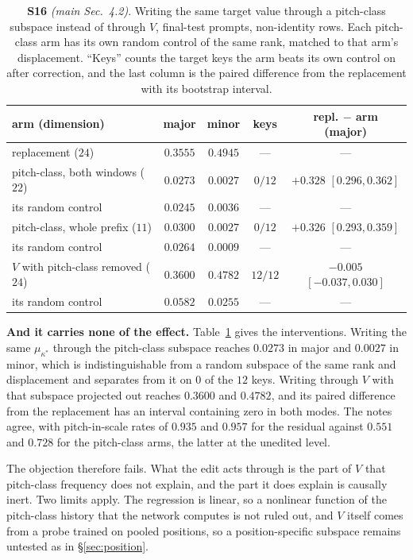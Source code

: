 \documentclass{article}
\begin{document}
\begin{table}[!t]
\centering
\caption{\textbf{S16} \textit{(main Sec.~4.2)}. Writing the same target value through a
pitch-class subspace instead of through $V$, final-test prompts, non-identity rows.
Each pitch-class arm has its own random control of the same rank, matched to that arm's
displacement. ``Keys'' counts the target keys the arm beats its own control on after
correction, and the last column is the paired difference from the replacement with its
bootstrap interval.}
\label{tab:supp-pitchclass}
\footnotesize
\setlength{\tabcolsep}{3pt}
\begin{tabular}{@{}lcccc@{}}
\toprule
arm (dimension) & major & minor & keys & repl. $-$ arm (major)\\
\midrule
replacement ($24$)         & $0.3555$ & $0.4945$ & --- & ---\\
pitch-class, both windows ($22$) & $0.0273$ & $0.0027$ & $0/12$ & $+0.328$ $[0.296,0.362]$\\
\quad its random control    & $0.0245$ & $0.0036$ & --- & ---\\
pitch-class, whole prefix ($11$) & $0.0300$ & $0.0027$ & $0/12$ & $+0.326$ $[0.293,0.359]$\\
\quad its random control    & $0.0264$ & $0.0009$ & --- & ---\\
$V$ with pitch-class removed ($24$) & $0.3600$ & $0.4782$ & $12/12$ & $-0.005$ $[-0.037,0.030]$\\
\quad its random control    & $0.0582$ & $0.0255$ & --- & ---\\
\bottomrule
\end{tabular}
\end{table}

\textbf{And it carries none of the effect.} Table~\ref{tab:supp-pitchclass} gives the
interventions. Writing the same $\mu_{\kappa^*}$ through the pitch-class subspace
reaches $0.0273$ in major and $0.0027$ in minor, which is indistinguishable from a
random subspace of the same rank and displacement and separates from it on $0$ of the
$12$ keys. Writing through $V$ with that subspace projected out reaches $0.3600$ and
$0.4782$, and its paired difference from the replacement has an interval containing zero
in both modes. The notes agree, with pitch-in-scale rates of $0.935$ and $0.957$ for the
residual against $0.551$ and $0.728$ for the pitch-class arms, the latter at the
unedited level.

The objection therefore fails. What the edit acts through is the part of $V$ that
pitch-class frequency does not explain, and the part it does explain is causally inert.
Two limits apply. The regression is linear, so a nonlinear function of the
pitch-class history that the network computes is not ruled out, and $V$ itself comes from
a probe trained on pooled positions, so a position-specific subspace remains untested as
in \S\ref{sec:position}.
\end{document}
